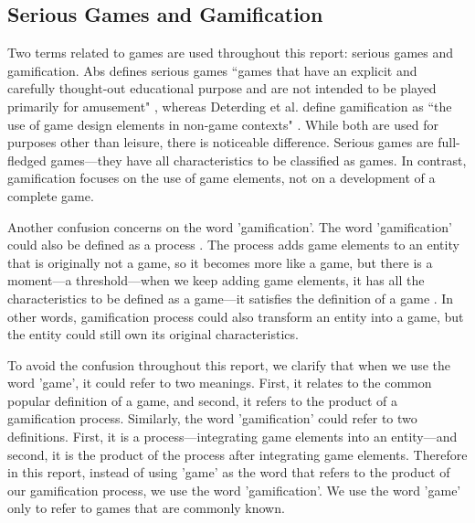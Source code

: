 \documentclass[12pt, a4paper]{report}
\begin{document}
\subsection{Serious Games and Gamification}
Two terms related to games are used throughout this report: serious games and gamification. Abs defines serious games ``games that have an explicit and carefully thought-out educational purpose and are not intended to be played primarily for amusement" \cite{abt1987serious}, whereas Deterding et al. define gamification as ``the use of game design elements in non-game contexts" \cite{deterding2011game}. While both are used for purposes other than leisure, there is noticeable difference. Serious games are full-fledged games---they have all characteristics to be classified as games. In contrast, gamification focuses on the use of game elements, not on a development of a complete game. 

Another confusion concerns on the word 'gamification'. The word 'gamification' could also be defined as a process \cite{werbach2014re}. The process adds game elements to an entity that is originally not a game, so it becomes more like a game, but there is a moment---a threshold---when we keep adding game elements, it has all the characteristics to be defined as a game---it satisfies the definition of a game \cite{yohannis2014defining}. In other words, gamification process could also transform an entity into a game, but the entity could still own its original characteristics. 

To avoid the confusion throughout this report, we clarify that when we use the word 'game', it could refer to two meanings. First, it relates to the common popular definition of a game, and second, it refers to the product of a gamification process. Similarly, the word 'gamification' could refer to two definitions. First, it is a process---integrating game elements into an entity---and second, it is the product of the process after integrating game elements. Therefore in this report, instead of using 'game' as the word that refers to the product of our gamification process, we use the word 'gamification'. We use the word 'game' only to refer to games that are commonly known.        
\end{document}
